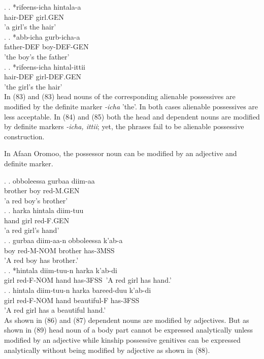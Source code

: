 \documentclass[11pt,a4paper]{article}
\begin{document}
	\ex.
	\ag.
	*rifeens-icha hintala-a\\
	hair-DEF girl.GEN\\
	'a girl's the hair'\\
	
	\ex.
	\ag.
	*abb-icha gurb-icha-a\\
	father-DEF boy-DEF-GEN\\
	'the boy's the father'\\
	
	\ex.
	\ag.
	*rifeens-icha hintal-ittii\\
	hair-DEF girl-DEF.GEN\\
	'the girl's the hair'\\
	
	In (83) and (83) head nouns of the corresponding alienable possessives are modified by the definite marker \emph{-icha} 'the'. In both cases alienable possessives are less acceptable. In (84) and (85) both the head and dependent nouns are modified by definite markers \emph{-icha, ittii}; yet, the phrases fail to be alienable possessive construction. 
	
	In Afaan Oromoo, the possessor noun can be modified by an adjective and definite marker.
	
	\ex.
	\ag.
	obboleessa   gurbaa diim-aa\\
	brother 	boy red-M.GEN\\
	'a red boy's brother'\\
	
	\ex.
	\ag.
	harka hintala diim-tuu\\
	hand girl red-F.GEN\\
	'a red girl's hand'\\
	
	\ex.
	\ag.
	gurbaa diim-aa-n obboleessa k'ab-a\\
	boy    red-M-NOM brother has-3MSS\\
	'A red boy has brother.'\\
	
	\ex.
	\ag.
	*hintala diim-tuu-n harka k'ab-di\\
	girl red-F-NOM hand has-3FSS\
	'A red girl has hand.'\\
	
	\ex.
	\ag.
	hintala diim-tuu-n harka bareed-duu k'ab-di\\
	girl red-F-NOM hand beautiful-F has-3FSS\\
	'A red girl has a beautiful hand.'\\
	
	As shown in (86) and (87) dependent nouns are modified by adjectives. But as shown in (89) head noun of a body part cannot be expressed analytically unless modified by an adjective while kinship possessive genitives can be expressed analytically without being modified by adjective as shown in (88). 
	
\end{document}
